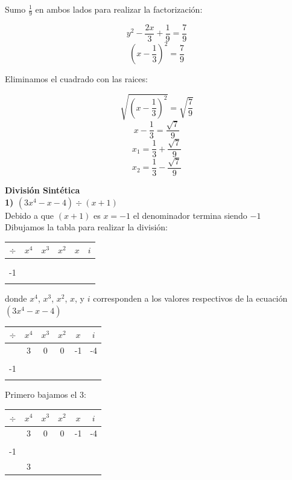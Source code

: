 \documentclass[11pt]{report}
\begin{document}
\indent Sumo $\frac{1}{9}$ en ambos lados para realizar la factorización:

$$y^2-\frac{2x}{3}+\frac{1}{9}=\frac{7}{9}$$
$$\left(x-\frac{1}{3}\right)^2=\frac{7}{9}$$

\indent Eliminamos el cuadrado con las raices:

$$\sqrt{\left(x-\frac{1}{3}\right)^2}=\sqrt{\frac{7}{9}}$$
$$x-\frac{1}{3}=\frac{\sqrt{7}}{9}$$
$$x_1=\frac{1}{3}+\frac{\sqrt{7}}{9}$$
$$x_2=\frac{1}{3}-\frac{\sqrt{7}}{9}$$

\pagebreak \textbf {División Sintética}\\[2mm]
\indent \textbf { 1) $(3x^{4}-x-4) \div (x+1)$ }\\[2mm]
\indent Debido a que $(x+1)$ es $x=-1$ el denominador termina siendo $-1$ \\[2mm]
\indent Dibujamos la tabla para realizar la división:

\begin{center}
	\begin{tabular}{c|ccccc|}
		$\div$& $x^{4}$ & $x^{3}$ & $x^{2}$ & $x$ & $i$\\ \hline
		& & & & &\\
		& & & & &\\
		-1 & & & & &\\ \hline
		& & & & & \\
	\end{tabular}
\end{center}

\indent donde $x^{4}$, $x^{3}$, $x^{2}$, $x$, y $i$ corresponden a los valores respectivos de la ecuación $(3x^{4}-x-4)$
\begin{center}
	\begin{tabular}{c|ccccc|}
		$\div$& $x^{4}$ & $x^{3}$ & $x^{2}$ & $x$ & $i$\\ \hline
		& 3 & 0 & 0 & -1 & -4\\
		& & & & &\\
		-1 & &  &  &  &  \\ \hline
		&  &  &  &  &  \\
	\end{tabular}
\end{center}

\indent Primero bajamos el $3$:
\begin{center}
	\begin{tabular}{c|ccccc|}
		$\div$& $x^{4}$ & $x^{3}$ & $x^{2}$ & $x$ & $i$\\ \hline
		& 3 & 0 & 0 & -1 & -4\\
		& & & & &\\
		-1 & &  &  &  &  \\ \hline
		& 3 &  &  &  & \\
	\end{tabular}
\end{center}
\end{document}
